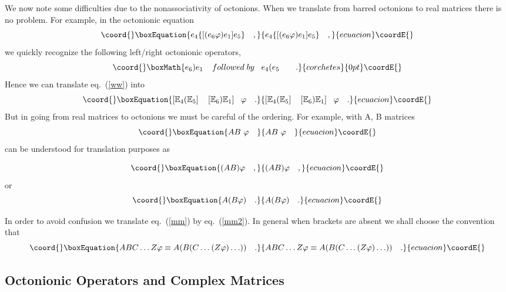 \documentclass[a4paper,12pt]{book}
\begin{document}
We now note some difficulties due to the nonassociativity of octonions. When
we translate from barred octonions to \coordHE{} real matrices there is no
problem. For example, in the octonionic equation 
\begin{equation}\coord{}\boxEquation{
e_{4}\{[(e_{6}\varphi )e_{1}]e_{5}\}\quad ,  \label{ww}
}{
e_{4}\{[(e_{6}\varphi )e_{1}]e_{5}\}\quad ,  }{ecuacion}\coordE{}\end{equation}
we quickly recognize the following left/right octonionic operators, 
\[\coord{}\boxMath{
e_{6}\mathbf{)}e_{1}\;\;\;\;followed\;by\;\;\;e_{4}\mathbf{(}e_{5}\quad
\quad . 
}{corchetes}{0pt}\coordE{}\]
Hence we can translate eq.~(\ref{ww}) into 
\begin{equation}\coord{}\boxEquation{
\left[ \Bbb{E}_{4}\mathbf{(}\Bbb{E}_{5}\right] \quad \left[ \Bbb{E}_{6}
\mathbf{)}\Bbb{E}_{1}\right] ~~\varphi \quad .
}{
\left[ \Bbb{E}_{4}\mathbf{(}\Bbb{E}_{5}\right] \quad \left[ \Bbb{E}_{6}
\mathbf{)}\Bbb{E}_{1}\right] ~~\varphi \quad .
}{ecuacion}\coordE{}\end{equation}
But in going from \coordHE{} real matrices to octonions we must be careful
of the ordering. For example, with A, B matrices 
\begin{equation}\coord{}\boxEquation{
AB~\varphi ~~~  \label{mm}
}{
AB~\varphi ~~~  }{ecuacion}\coordE{}\end{equation}
can be understood for translation purposes as

\begin{equation}\coord{}\boxEquation{  \label{mm1}
(AB) \varphi \quad ,
}{  (AB) \varphi \quad ,
}{ecuacion}\coordE{}\end{equation}
or 
\begin{equation}\coord{}\boxEquation{  \label{mm2}
A (B \varphi) \quad .
}{  A (B \varphi) \quad .
}{ecuacion}\coordE{}\end{equation}

In order to avoid confusion we translate eq.~(\ref{mm}) by eq.~(\ref{mm2}).
In general when brackets are absent we shall choose the convention that 
\begin{equation}\coord{}\boxEquation{
ABC\ldots Z\varphi \equiv A(B(C\ldots (Z\varphi )\ldots ))\quad .
}{
ABC\ldots Z\varphi \equiv A(B(C\ldots (Z\varphi )\ldots ))\quad .
}{ecuacion}\coordE{}\end{equation}

\subsection{Octonionic Operators and \coordHE{} Complex Matrices}
\end{document}
